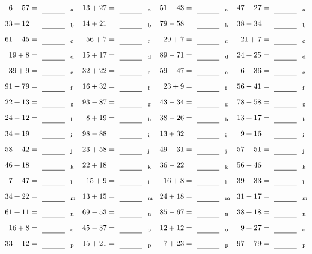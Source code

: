 \documentclass
[
  draft    = true,
  fontsize = 11pt,
  parskip  = half-
]
{scrartcl}
\begin{document}
\clearpage
\begin{align*}
    \pline{6+57}&=\rline{a}
  & \pline{13+27}&=\rline{a}
  & \pline{51-43}&=\rline{a}
  & \pline{47-27}&=\rline{a} \\[1ex]
    \pline{33+12}&=\rline{b}
  & \pline{14+21}&=\rline{b}
  & \pline{79-58}&=\rline{b}
  & \pline{38-34}&=\rline{b} \\[1ex]
    \pline{61-45}&=\rline{c}
  & \pline{56+7}&=\rline{c}
  & \pline{29+7}&=\rline{c}
  & \pline{21+7}&=\rline{c} \\[1ex]
    \pline{19+8}&=\rline{d}
  & \pline{15+17}&=\rline{d}
  & \pline{89-71}&=\rline{d}
  & \pline{24+25}&=\rline{d} \\[1ex]
    \pline{39+9}&=\rline{e}
  & \pline{32+22}&=\rline{e}
  & \pline{59-47}&=\rline{e}
  & \pline{6+36}&=\rline{e} \\[1ex]
    \pline{91-79}&=\rline{f}
  & \pline{16+32}&=\rline{f}
  & \pline{23+9}&=\rline{f}
  & \pline{56-41}&=\rline{f} \\[1ex]
    \pline{22+13}&=\rline{g}
  & \pline{93-87}&=\rline{g}
  & \pline{43-34}&=\rline{g}
  & \pline{78-58}&=\rline{g} \\[1ex]
    \pline{24-12}&=\rline{h}
  & \pline{8+19}&=\rline{h}
  & \pline{38-26}&=\rline{h}
  & \pline{13+17}&=\rline{h} \\[1ex]
    \pline{34-19}&=\rline{i}
  & \pline{98-88}&=\rline{i}
  & \pline{13+32}&=\rline{i}
  & \pline{9+16}&=\rline{i} \\[1ex]
    \pline{58-42}&=\rline{j}
  & \pline{23+58}&=\rline{j}
  & \pline{49-31}&=\rline{j}
  & \pline{57-51}&=\rline{j} \\[1ex]
    \pline{46+18}&=\rline{k}
  & \pline{22+18}&=\rline{k}
  & \pline{36-22}&=\rline{k}
  & \pline{56-46}&=\rline{k} \\[1ex]
    \pline{7+47}&=\rline{l}
  & \pline{15+9}&=\rline{l}
  & \pline{16+8}&=\rline{l}
  & \pline{39+33}&=\rline{l} \\[1ex]
    \pline{34+22}&=\rline{m}
  & \pline{13+15}&=\rline{m}
  & \pline{24+18}&=\rline{m}
  & \pline{31-17}&=\rline{m} \\[1ex]
    \pline{61+11}&=\rline{n}
  & \pline{69-53}&=\rline{n}
  & \pline{85-67}&=\rline{n}
  & \pline{38+18}&=\rline{n} \\[1ex]
    \pline{16+8}&=\rline{o}
  & \pline{45-37}&=\rline{o}
  & \pline{12+12}&=\rline{o}
  & \pline{9+27}&=\rline{o} \\[1ex]
    \pline{33-12}&=\rline{p}
  & \pline{15+21}&=\rline{p}
  & \pline{7+23}&=\rline{p}
  & \pline{97-79}&=\rline{p}
\end{align*}
\end{document}
